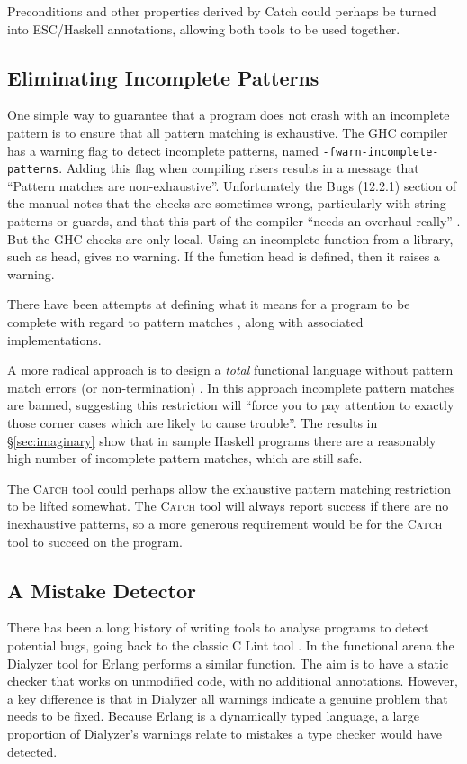 \documentclass[preprint]{sigplanconf}
\newcommand{\T}[1]{\texttt{#1}}
\newcommand{\C}[1]{\textsf{#1}}
\newcommand{\catch}{\textsc{Catch}}
\begin{document}
Preconditions and other properties derived by Catch could perhaps be turned into ESC/Haskell annotations, allowing both tools to be used together.

\subsection{Eliminating Incomplete Patterns}

One simple way to guarantee that a program does not crash with an incomplete pattern is to ensure that all pattern matching is exhaustive. The GHC compiler  \citep{ghc} has a warning flag to detect incomplete patterns, named \T{-fwarn-incomplete-patterns}. Adding this flag when compiling risers results in a message that ``Pattern matches are non-exhaustive''. Unfortunately the Bugs (12.2.1) section of the manual notes that the checks are sometimes wrong, particularly with string patterns or guards, and that this part of the compiler ``needs an overhaul really'' \citep{ghc_manual}. But the GHC checks are only local. Using an incomplete function from a library, such as \C{head}, gives no warning. If the function \C{head} is defined, then it raises a warning.

There have been attempts at defining what it means for a program to be complete with regard to pattern matches \citep{maranget:pattern_warnings}, along with associated implementations.

A more radical approach is to design a \textit{total} functional language without pattern match errors (or non-termination) \citep{turner:total}. In this approach incomplete pattern matches are banned, suggesting this restriction will ``force you to pay attention to exactly those corner cases which are likely to cause trouble''. The results in \S\ref{sec:imaginary} show that in sample Haskell programs there are a reasonably high number of incomplete pattern matches, which are still safe.

The \catch{} tool could perhaps allow the exhaustive pattern matching restriction to be lifted somewhat. The \catch{} tool will always report success if there are no inexhaustive patterns, so a more generous requirement would be for the \catch{} tool to succeed on the program.

\subsection{A Mistake Detector}

There has been a long history of writing tools to analyse programs to detect potential bugs, going back to the classic C Lint tool \citep{lint}. In the functional arena the Dialyzer tool \citep{dialyzer} for Erlang \citep{erlang} performs a similar function. The aim is to have a static checker that works on unmodified code, with no additional annotations. However, a key difference is that in Dialyzer all warnings indicate a genuine problem that needs to be fixed. Because Erlang is a dynamically typed language, a large proportion of Dialyzer's warnings relate to mistakes a type checker would have detected.
\end{document}
